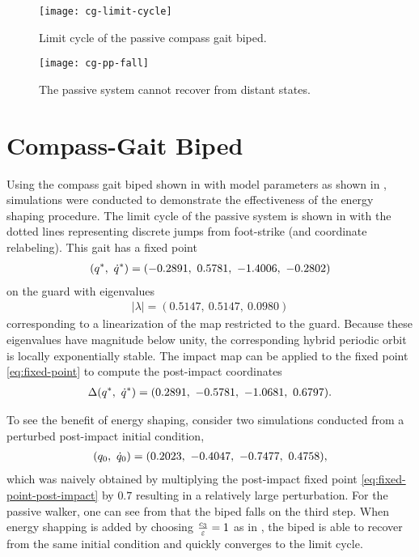 \begin{figure}
  \centering
  \texttt{[image: cg-limit-cycle]}
  \caption{Limit cycle of the passive compass gait biped.}
  \label{fig:lc}
\end{figure}

\begin{figure}
  \centering
  \texttt{[image: cg-pp-fall]}
  \caption{The passive system cannot recover from distant states.}
  \label{fig:pp-fall}
\end{figure}

\section{Compass-Gait Biped}

Using the compass gait biped shown in  with model
parameters as shown in , simulations were conducted to
demonstrate the effectiveness of the energy shaping procedure.
%
The limit cycle of the passive system is shown in  with the
dotted lines representing discrete jumps from foot-strike (and coordinate
relabeling).
%
This gait has a fixed point
%
\begin{align}
  \label{eq:fixed-point}
  (q^{*}, \ \dot{q}^{*}) = (-0.2891, \ 0.5781, \ -1.4006, \ -0.2802)
\end{align}
%
on the guard with eigenvalues
%
\begin{align}
  |\lambda| = (0.5147, \ 0.5147, \ 0.0980)
\end{align}
%
corresponding to a linearization of the \Poincare{} map restricted to the guard.
%
Because these eigenvalues have magnitude below unity, the corresponding hybrid
periodic orbit is locally exponentially stable.
%
The impact map can be applied to the fixed point \eqref{eq:fixed-point} to
compute the post-impact coordinates
%
\begin{align}
  \label{eq:fixed-point-post-impact}
  \Delta(q^{*}, \ \dot{q}^{*}) = (0.2891, \ -0.5781, \ -1.0681, \ 0.6797).
\end{align}

To see the benefit of energy shaping, consider two simulations conducted from a
perturbed post-impact initial condition,
%
\begin{align}
  \label{eq:ic-sim-1}
  (q_{0}, \ \dot{q}_{0}) = (0.2023, \ -0.4047, \ -0.7477, \ 0.4758),
\end{align}
%
which was naively obtained by multiplying the post-impact fixed point
\eqref{eq:fixed-point-post-impact} by $0.7$ resulting in a relatively large
perturbation.
%
For the passive walker, one can see from  that the biped
falls on the third step.
%
When energy shapping is added by choosing $\frac{c_{3}}{\varepsilon} = 1$ as in
, the biped is able to recover from the same initial
condition and quickly converges to the limit cycle.
%

